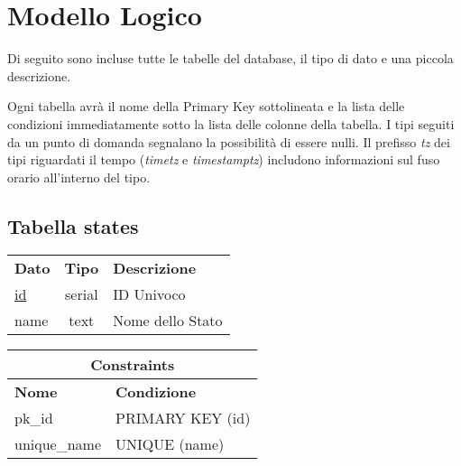 \section{Modello Logico}%
\label{sec:modello_logico}

Di seguito sono incluse tutte le tabelle del database, il tipo di dato e una piccola descrizione.

Ogni tabella avr\`a il nome della Primary Key sottolineata e la lista delle condizioni immediatamente sotto la lista delle colonne della tabella. I tipi seguiti da un punto di domanda segnalano la possibilit\`a di essere nulli. Il prefisso \emph{tz} dei tipi riguardati il tempo (\emph{timetz} e \emph{timestamptz}) includono informazioni sul fuso orario all'interno del tipo.

\begin{center}
    \subsection*{Tabella \textnormal{states}}
    
    \begin{tabularx}{\textwidth}{l c X}
        \toprule
        \textbf{Dato} & \textbf{Tipo} & \textbf{Descrizione}\\
        \underline{id} & serial & ID Univoco\\
        name & text & Nome dello Stato\\
        \midrule
    \end{tabularx}
    \begin{tabularx}{\textwidth}{l X}
        \multicolumn{2}{c}{\textbf{Constraints}}\\
        \midrule
        \textbf{Nome} & \textbf{Condizione}\\
        pk\_id & PRIMARY KEY (id)\\
        unique\_name & UNIQUE (name)\\
        \bottomrule
    \end{tabularx}
    \bigskip
\end{center}

